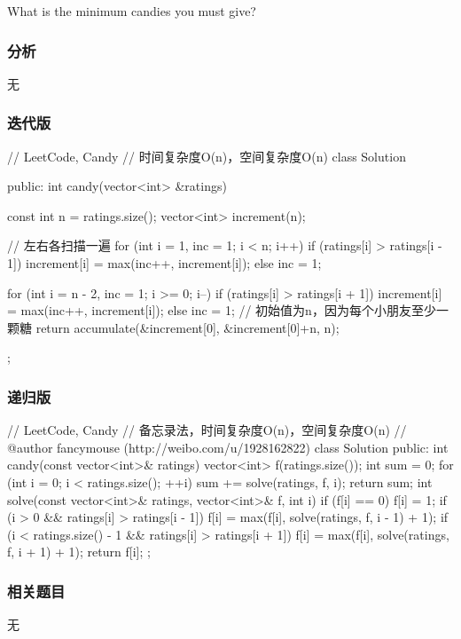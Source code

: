 What is the minimum candies you must give?


\subsubsection{分析}
无


\subsubsection{迭代版}
\begin{Code}
// LeetCode, Candy
// 时间复杂度O(n)，空间复杂度O(n)
class Solution {
public:
    int candy(vector<int> &ratings) {
        const int n = ratings.size();
        vector<int> increment(n);

        // 左右各扫描一遍
        for (int i = 1, inc = 1; i < n; i++) {
            if (ratings[i] > ratings[i - 1])
                increment[i] = max(inc++, increment[i]);
            else
                inc = 1;
        }

        for (int i = n - 2, inc = 1; i >= 0; i--) {
            if (ratings[i] > ratings[i + 1])
                increment[i] = max(inc++, increment[i]);
            else
                inc = 1;
        }
        // 初始值为n，因为每个小朋友至少一颗糖
        return accumulate(&increment[0], &increment[0]+n, n);
    }
};
\end{Code}


\subsubsection{递归版}
\begin{Code}
// LeetCode, Candy
// 备忘录法，时间复杂度O(n)，空间复杂度O(n)
// @author fancymouse (http://weibo.com/u/1928162822)
class Solution {
public:
    int candy(const vector<int>& ratings) {
        vector<int> f(ratings.size());
        int sum = 0;
        for (int i = 0; i < ratings.size(); ++i)
            sum += solve(ratings, f, i);
        return sum;
    }
    int solve(const vector<int>& ratings, vector<int>& f, int i) {
        if (f[i] == 0) {
            f[i] = 1;
            if (i > 0 && ratings[i] > ratings[i - 1])
                f[i] = max(f[i], solve(ratings, f, i - 1) + 1);
            if (i < ratings.size() - 1 && ratings[i] > ratings[i + 1])
                f[i] = max(f[i], solve(ratings, f, i + 1) + 1);
        }
        return f[i];
    }
};
\end{Code}


\subsubsection{相关题目}
\begindot
\item 无
\myenddot



